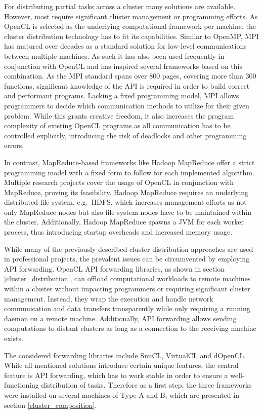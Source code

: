 For distributing partial tasks across a cluster many solutions are available. However, most require significant cluster management or programming efforts. As OpenCL is selected as the underlying computational framework per machine, the cluster distribution technology has to fit its capabilities.
Similar to OpenMP, MPI has matured over decades as a standard solution for low-level communications between multiple machines. As such it has also been used frequently in conjunction with OpenCL and has inspired several frameworks based on this combination\cite{mpi-acc}\cite{starpu}. As the MPI standard spans over 800 pages, covering more than 300 functions\cite{mpi_spec}, significant knowledge of the API is required in order to build correct and performant programs. Lacking a fixed programming model, MPI allows programmers to decide which communication methods to utilize for their given problem. While this grants creative freedom, it also increases the program complexity of existing OpenCL programs as all communication has to be controlled explicitly, introducing the risk of deadlocks and other programming errors.

In contrast, MapReduce-based frameworks like Hadoop MapReduce offer a strict programming model with a fixed form to follow for each implemented algorithm. Multiple research projects cover the usage of OpenCL in conjunction with MapReduce, proving its feasibility\cite{hadoopcl}\cite{hadoop+}. Hadoop MapReduce requires an underlying distributed file system, e.g.~HDFS, which increases management efforts as not only MapReduce nodes but also file system nodes have to be maintained within the cluster. Additionally, Hadoop MapReduce spawns a JVM for each worker process, thus introducing startup overheads and increased memory usage.

While many of the previously described cluster distribution approaches are used in professional projects, the prevalent issues can be circumvented by employing API forwarding. OpenCL API forwarding libraries, as shown in section \ref{cluster_distribution}, can offload computational workloads to remote machines within a cluster without impacting programmers or requiring significant cluster management. Instead, they wrap the execution and handle network communication and data transfers transparently while only requiring a running daemon on a remote machine. Additionally, API forwarding allows sending computations to distant clusters as long as a connection to the receiving machine exists.

The considered forwarding libraries include SnuCL, VirtualCL and dOpenCL. While all mentioned solutions introduce certain unique features, the central feature is API forwarding, which has to work stable in order to ensure a well-functioning distribution of tasks. Therefore as a first step, the three frameworks were installed on several machines of Type A and B, which are presented in section \ref{cluster_composition}.

